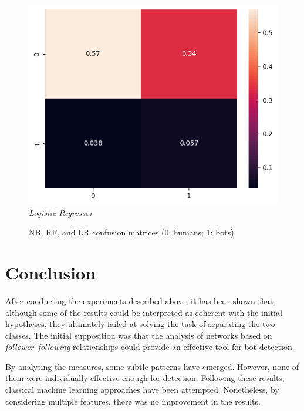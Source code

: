 \documentclass[12pt, a4paper]{article}
\begin{document}
\begin{figure}[H]
    		\hfill
    		\begin{minipage}[b]{0.46\textwidth}    				
        		\centering
        		\includegraphics[width=\textwidth]{complete_lr_confusion_matrix.png}
        		\textit{\small Logistic Regressor}
    		\end{minipage}
    		\caption{NB, RF, and LR confusion matrices (0: humans; 1: bots)}
		\end{figure}
		

\section{Conclusion} \label{conclusion}
	After conducting the experiments described above, it has been shown that, although some of the results could be interpreted as coherent with the initial hypotheses, they ultimately failed at solving the task of separating the two classes. The initial supposition was that the analysis of networks based on \textit{follower--following} relationships could provide an effective tool for bot detection.
	\vspace{0.2cm}
	
	By analysing the measures, some subtle patterns have emerged. However, none of them were individually effective enough for detection.
	Following these results, classical machine learning approaches have been attempted. Nonetheless, by considering multiple features, there was no improvement in the results.	
\end{document}
